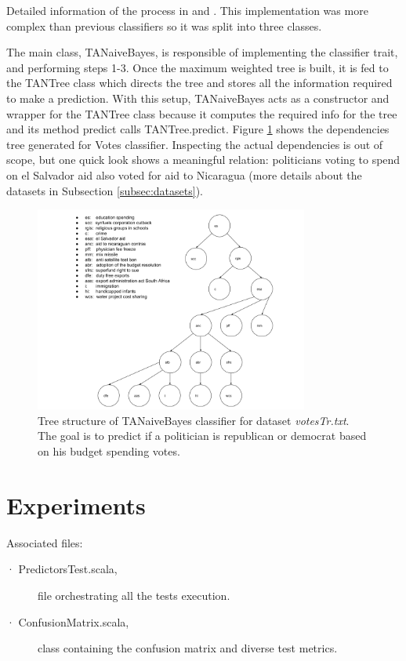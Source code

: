 \documentclass[a4paper,10pt]{article}
\begin{document}
Detailed information of the process in \cite{Uther2011} and \cite{Padmanaban2014}. This implementation was more complex than previous classifiers so it was split into three classes.

The main class, TANaiveBayes, is responsible of implementing the classifier trait, and performing steps 1-3. Once the maximum weighted tree is built, it is fed to the TANTree class which directs the tree and stores all the information required to make a prediction. With this setup, TANaiveBayes acts as a constructor and wrapper for the TANTree class because it computes the required info for the tree and its method predict calls TANTree.predict. Figure \ref{fig:tantree} shows the dependencies tree generated for Votes classifier. Inspecting the actual dependencies is out of scope, but one quick look shows a meaningful relation: politicians voting to spend on el Salvador aid also voted for aid to Nicaragua (more details about the datasets in Subsection \ref{subsec:datasets}).

\begin{figure}[H]
\centering
\includegraphics[keepaspectratio, width=9cm]{images/TANTree.png}
\caption{Tree structure of TANaiveBayes classifier for dataset \textit{votesTr.txt}. The goal is to predict if a politician is republican or democrat based on his budget spending votes.}
\label{fig:tantree}
\end{figure}

\section{Experiments}
\label{sec:experiments}

Associated files:
\begin{description}
 \item [· PredictorsTest.scala,] file orchestrating all the tests execution.
 \item [· ConfusionMatrix.scala,] class containing the confusion matrix and diverse test metrics.
\end{description}
\end{document}
